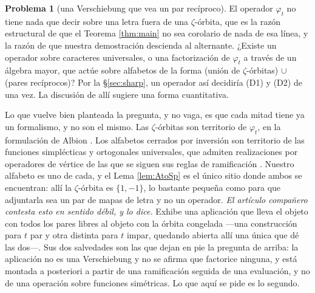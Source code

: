\documentclass[11pt,reqno]{amsart}
\theoremstyle{plain}
\theoremstyle{definition}
\newtheorem{problem}[theorem]{Problema}
\begin{document}
\begin{problem}[una Verschiebung que vea un par recíproco]\label{prob:versch}
El operador $\varphi_t$ no tiene nada que decir sobre una letra fuera de una $\zeta$-órbita, que es
la razón estructural de que el Teorema \ref{thm:main} no sea corolario de nada de esa línea, y la
razón de que nuestra demostración descienda al alternante. ¿Existe un operador sobre caracteres
universales, o una factorización de $\varphi_t$ a través de un álgebra mayor, que actúe sobre
alfabetos de la forma (unión de $\zeta$-órbitas) $\cup$ (pares recíprocos)? Por la \S\ref{sec:sharp},
un operador así decidiría (D1) y (D2) de una vez. La discusión de allí sugiere una forma
cuantitativa.

Lo que vuelve bien planteada la pregunta, y no vaga, es que cada mitad tiene ya un formalismo, y no
son el mismo. Las $\zeta$-órbitas son territorio de $\varphi_t$, en la formulación de Albion
\cite{Alb23}. Los alfabetos cerrados por inversión son territorio de las funciones simplécticas y
ortogonales universales, que admiten realizaciones por operadores de vértice de las que se siguen sus
reglas de ramificación \cite{JJLW24}. Nuestro alfabeto es uno de cada, y el Lema \ref{lem:AtoSp} es
el único sitio donde ambos se encuentran: allí la $\zeta$-órbita es $\{1,-1\}$, lo bastante pequeña
como para que adjuntarla sea un par de mapas de letra y no un operador.
\emph{El artículo compañero \cite{PaperII} contesta esto en sentido débil, y lo dice.} Exhibe una
aplicación que lleva el objeto con todos los pares libres al objeto con la órbita congelada ---una
construcción para $t$ par y otra distinta para $t$ impar, quedando abierta allí una única que dé
las dos---. Sus dos salvedades son las que dejan en pie la pregunta de arriba: la aplicación no es
una Verschiebung y no se afirma que factorice ninguna, y está montada a posteriori a partir de una
ramificación seguida de una evaluación, y no de una operación sobre funciones simétricas. Lo que
aquí se pide es lo segundo.
\end{problem}
\end{document}
